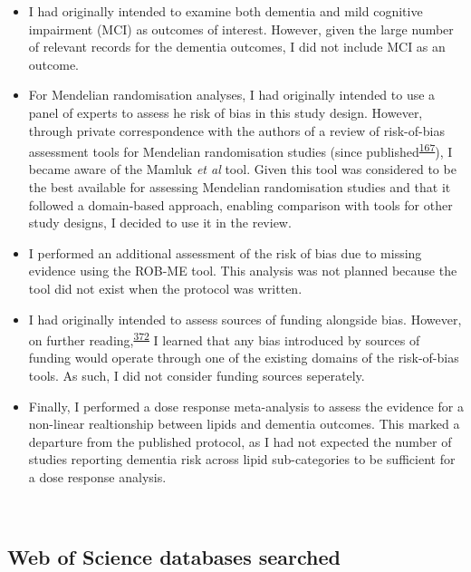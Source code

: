 \documentclass[a4paper, twoside]{templates/ociamthesis}
\begin{document}
\begin{itemize}
\item
  I had originally intended to examine both dementia and mild cognitive impairment (MCI) as outcomes of interest. However, given the large number of relevant records for the dementia outcomes, I did not include MCI as an outcome.
\item
  For Mendelian randomisation analyses, I had originally intended to use a panel of experts to assess he risk of bias in this study design. However, through private correspondence with the authors of a review of risk-of-bias assessment tools for Mendelian randomisation studies (since published\textsuperscript{\protect\hyperlink{ref-spiga2021}{167}}), I became aware of the Mamluk \emph{et al} tool. Given this tool was considered to be the best available for assessing Mendelian randomisation studies and that it followed a domain-based approach, enabling comparison with tools for other study designs, I decided to use it in the review.
\item
  I performed an additional assessment of the risk of bias due to missing evidence using the ROB-ME tool. This analysis was not planned because the tool did not exist when the protocol was written.
\item
  I had originally intended to assess sources of funding alongside bias. However, on further reading,\textsuperscript{\protect\hyperlink{ref-sterne2013}{372}} I learned that any bias introduced by sources of funding would operate through one of the existing domains of the risk-of-bias tools. As such, I did not consider funding sources seperately.
\item
  Finally, I performed a dose response meta-analysis to assess the evidence for a non-linear realtionship between lipids and dementia outcomes. This marked a departure from the published protocol, as I had not expected the number of studies reporting dementia risk across lipid sub-categories to be sufficient for a dose response analysis.
\end{itemize}

~

\hypertarget{appendix-wos-databases}{%
\subsection{Web of Science databases searched}\label{appendix-wos-databases}}
\end{document}
